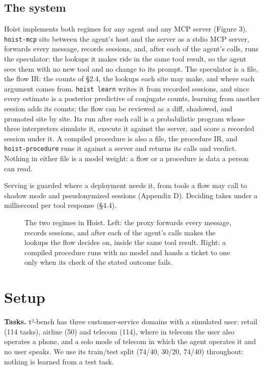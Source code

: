 \documentclass[10pt,twocolumn,letterpaper]{article}
\newcommand{\runin}[1]{{\sffamily\bfseries\color{accent}#1}}
\begin{document}
\subsection{The system}\label{the-system}

Hoist implements both regimes for any agent and any MCP server (Figure 3). \texttt{hoist-mcp} sits between the agent's host and the server as a stdio MCP server, forwards every message, records sessions, and, after each of the agent's calls, runs the speculator: the lookups it makes ride in the same tool result, so the agent sees them with no new tool and no change to its prompt. The speculator is a file, the flow IR: the counts of §2.4, the lookups each site may make, and where each argument comes from. \texttt{hoist\ learn} writes it from recorded sessions, and since every estimate is a posterior predictive of conjugate counts, learning from another session adds its counts; the flow can be reviewed as a diff, shadowed, and promoted site by site. Its run after each call is a probabilistic program \citep{nodeland2026fugue} whose three interpreters simulate it, execute it against the server, and score a recorded session under it. A compiled procedure is also a file, the procedure IR, and \texttt{hoist-procedure} runs it against a server and returns its calls and verdict. Nothing in either file is a model weight: a flow or a procedure is data a person can read.

Serving is guarded where a deployment needs it, from tools a flow may call to shadow mode and pseudonymized sessions (Appendix D). Deciding takes under a millisecond per tool response (§4.4).

\begin{figure}[tp]
\centering
{}
\caption{The two regimes in Hoist. Left: the proxy forwards every message, records sessions, and after each of the agent's calls makes the lookups the flow decides on, inside the same tool result. Right: a compiled procedure runs with no model and hands a ticket to one only when its check of the stated outcome fails.}
\label{fig:regimes}
\end{figure}

\section{Setup}\label{setup}

\runin{Tasks.} τ²-bench \citep{barres2025tau2} has three customer-service domains with a simulated user: retail (114 tasks), airline (50) and telecom (114), where in telecom the user also operates a phone, and a solo mode of telecom in which the agent operates it and no user speaks. We use its train/test split (74/40, 30/20, 74/40) throughout: nothing is learned from a test task.
\end{document}
